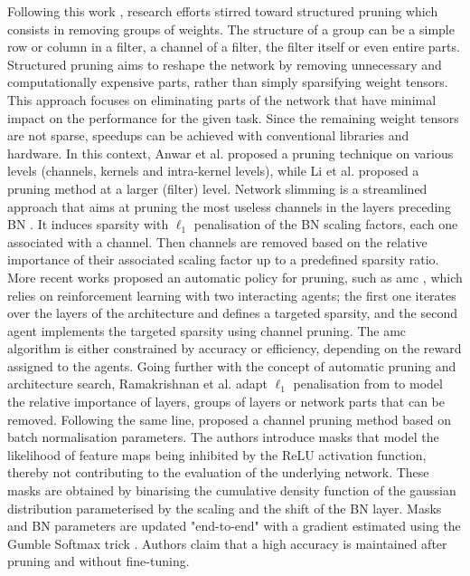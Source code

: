 Following this work \cite{DBLP:conf/nips/HanPTD15}, research efforts stirred
toward structured pruning which consists in removing groups of weights. The
structure of a group can be a simple row or column in a filter, a channel of a
filter, the filter itself or even entire parts. Structured pruning aims to
reshape the network by removing unnecessary and computationally expensive
parts, rather than simply sparsifying weight tensors. This approach focuses
on eliminating parts of the network that have minimal impact on the performance
for the given task. Since the remaining weight tensors are not sparse, speedups
can be achieved with conventional libraries and hardware. In this context, Anwar
et al. \cite{anwar2017structured} proposed a pruning technique on various levels
(channels, kernels and intra-kernel levels), while Li et al.
\cite{DBLP:conf/iclr/0022KDSG17} proposed a pruning method at a larger (filter)
level. Network slimming \cite{DBLP:conf/iccv/LiuLSHYZ17} is a streamlined
approach that aims at pruning the most useless channels in the layers preceding
\ac{BN} \cite{DBLP:conf/icml/IoffeS15}. It induces sparsity with $\ell_1$
penalisation of the \ac{BN} scaling factors, each one associated with a
channel. Then channels are removed based on the relative importance of their
associated scaling factor up to a predefined sparsity ratio. More recent works
proposed an automatic policy for pruning, such as \ac{amc}
\cite{DBLP:conf/eccv/HeLLWLH18}, which relies on reinforcement learning with two
interacting agents; the first one iterates over the layers of the architecture
and defines a targeted sparsity, and the second agent implements the targeted
sparsity using channel pruning. The \ac{amc} algorithm is either constrained by
accuracy or efficiency, depending on the reward assigned to the agents. Going
further with the concept of automatic pruning and architecture search,
Ramakrishnan et al. \cite{DBLP:conf/crv/RamakrishnanSN20} adapt $\ell_1$
penalisation from \cite{DBLP:conf/iccv/LiuLSHYZ17} to model the relative
importance of layers, groups of layers or network parts that can be removed.
Following the same line, \cite{DBLP:conf/icml/KangH20} proposed a channel
pruning method based on batch normalisation parameters. The authors introduce
masks that model the likelihood of feature maps being inhibited by the \ac{ReLU}
activation function, thereby not contributing to the evaluation of the
underlying network. These masks are obtained by binarising the cumulative
density function of the gaussian distribution parameterised by the scaling and
the shift of the BN layer. Masks and BN parameters are updated "end-to-end" with
a gradient estimated using the Gumble Softmax trick
\cite{DBLP:conf/iclr/JangGP17}. Authors claim that a high accuracy is maintained
after pruning and without fine-tuning. \\



